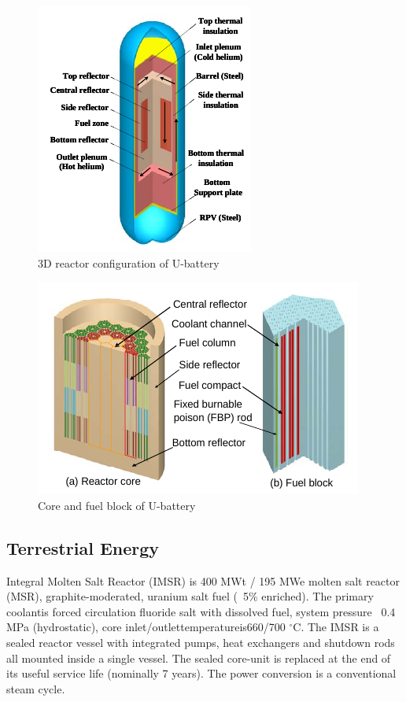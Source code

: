 \begin{figure}[htbp]
\centering
\includegraphics[scale=1]{Figs/ubattery3d.jpeg}
\caption{ 3D reactor configuration of U-battery}
\label{u3d}
\end{figure}

\begin{figure}[htbp]
\centering
\includegraphics[scale=1]{Figs/ubatterycore.jpeg}
\caption{ Core and fuel block of U-battery}
\label{ucore}
\end{figure}


\pagebreak
\subsection{Terrestrial Energy}
Integral Molten Salt Reactor (IMSR) is 400 MWt / 195 MWe molten salt reactor (MSR), graphite-moderated, uranium salt fuel (~5\% enriched). The primary coolantis forced circulation fluoride salt with dissolved fuel, system pressure ~0.4 MPa (hydrostatic), core inlet/outlettemperatureis660/700 $^\circ{}$C. The IMSR is a sealed reactor vessel with integrated pumps, heat exchangers and shutdown rods all mounted inside a single vessel. The sealed core-unit is replaced at the end of its useful service life (nominally 7 years). The power conversion is a conventional steam cycle.

